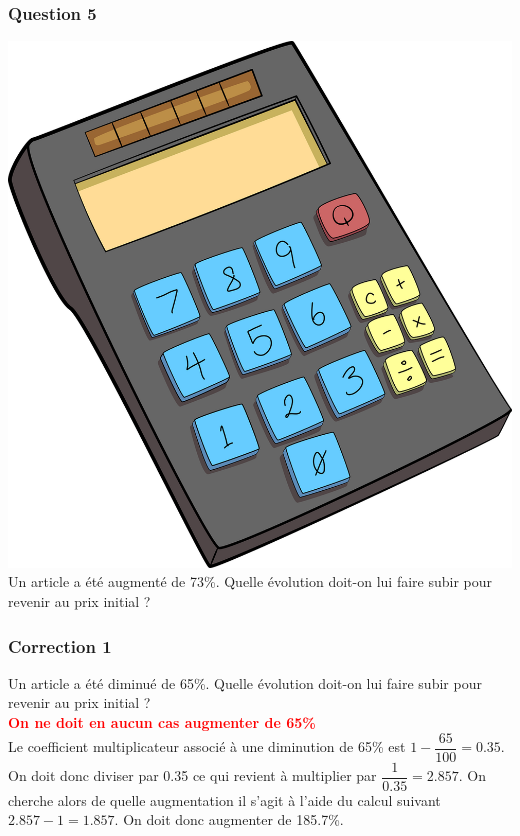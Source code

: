 \documentclass[15pt, mathserif]{beamer}
\begin{document}
\begin{frame} 
	\frametitle{Question 5}
 \includegraphics[scale=0.01]{calculatrice} Un article a été augmenté de 73\%. Quelle évolution doit-on lui faire subir pour revenir au prix initial ? \end{frame}


\begin{frame}
\vspace{-10mm}
	\frametitle{Correction 1}
\vspace*{1cm} Un article a été diminué de 65\%. Quelle évolution doit-on lui faire subir pour revenir au prix initial ? \\ \bcattention \textcolor{red}{\textbf{On ne doit en aucun cas augmenter de 65\%}} \\ Le coefficient multiplicateur associé à une diminution de 65\% est $1-\dfrac{65}{100}=0.35$. On doit donc diviser par 0.35 ce qui revient à multiplier par $\dfrac{1}{0.35}=2.857$. On cherche alors de quelle augmentation il s'agit à l'aide du calcul suivant $2.857-1=1.857$. On doit donc augmenter de 185.7\%. \\ \begin{center}  
  \end{center}\end{frame}
\end{document}
